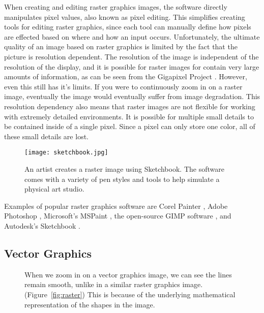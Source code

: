 When creating and editing raster graphics images, the software directly manipulates pixel values, also known as pixel editing.
This simplifies creating tools for editing raster graphics, since each tool can manually define how pixels are effected based on where and how an input occurs. 
Unfortunately, the ultimate quality of an image based on raster graphics is limited by the fact that the picture is resolution dependent.
The resolution of the image is independent of the resolution of the display, and it is possible for raster images for contain very large amounts of information, as can be seen from the Gigapixel Project \autocite{gigapixel}.
However, even this still has it's limits.
If you were to continuously zoom in on a raster image, eventually the image would eventually suffer from image degradation. 
This resolution dependency also means that raster images are not flexible for working with extremely detailed environments.
It is possible for multiple small details to be contained inside of a single pixel.
Since a pixel can only store one color, all of these small details are lost.


\begin{figure}
\texttt{[image: sketchbook.jpg]}
\caption[Creating a Raster Image in Sketchbook]{An artist creates a raster image using Sketchbook. The software comes with a variety of pen styles and tools to help simulate a physical art studio. \autocite{sketchbook}}
\end{figure}



Examples of popular raster graphics software are Corel Painter \autocite{coreal}, Adobe Photoshop \autocite{photoshop}, Microsoft's MSPaint \autocite{mspaint}, the open-source GIMP software \autocite{gimp}, and Autodesk's Sketchbook \autocite{sketchbook}.

\subsection{Vector Graphics}
\begin{figure}
\caption[Zooming in on a Vector Graphics Image]
{When we zoom in on a vector graphics image, we can see the lines remain smooth, unlike in a similar raster graphics image. (Figure~\ref{fig:raster}) This is because of the underlying mathematical representation of the shapes in the image. \autocite{printingcollection}}
\end{figure}

